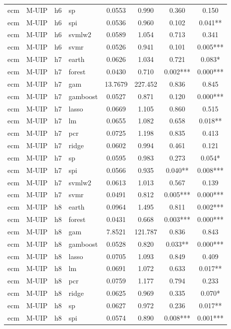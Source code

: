 \begin{ThreePartTable}
\begin{longtable}[t]{llclcccc}
ecm & M-UIP & h6 & sp & 0.0553 & 0.990 & 0.360 & 0.150\\
ecm & M-UIP & h6 & spi & 0.0536 & 0.960 & 0.102 & 0.041**\\
ecm & M-UIP & h6 & svmlw2 & 0.0589 & 1.054 & 0.713 & 0.341\\
ecm & M-UIP & h6 & svmr & 0.0526 & 0.941 & 0.101 & 0.005***\\
\addlinespace
ecm & M-UIP & h7 & earth & 0.0626 & 1.034 & 0.721 & 0.083*\\
ecm & M-UIP & h7 & forest & 0.0430 & 0.710 & 0.002*** & 0.000***\\
ecm & M-UIP & h7 & gam & 13.7679 & 227.452 & 0.836 & 0.845\\
ecm & M-UIP & h7 & gamboost & 0.0527 & 0.871 & 0.120 & 0.000***\\
ecm & M-UIP & h7 & lasso & 0.0669 & 1.105 & 0.860 & 0.515\\
ecm & M-UIP & h7 & lm & 0.0655 & 1.082 & 0.658 & 0.018**\\
ecm & M-UIP & h7 & pcr & 0.0725 & 1.198 & 0.835 & 0.413\\
ecm & M-UIP & h7 & ridge & 0.0602 & 0.994 & 0.461 & 0.121\\
ecm & M-UIP & h7 & sp & 0.0595 & 0.983 & 0.273 & 0.054*\\
ecm & M-UIP & h7 & spi & 0.0566 & 0.935 & 0.040** & 0.008***\\
ecm & M-UIP & h7 & svmlw2 & 0.0613 & 1.013 & 0.567 & 0.139\\
ecm & M-UIP & h7 & svmr & 0.0491 & 0.812 & 0.005*** & 0.000***\\
\addlinespace
ecm & M-UIP & h8 & earth & 0.0964 & 1.495 & 0.811 & 0.002***\\
ecm & M-UIP & h8 & forest & 0.0431 & 0.668 & 0.003*** & 0.000***\\
ecm & M-UIP & h8 & gam & 7.8521 & 121.787 & 0.836 & 0.843\\
ecm & M-UIP & h8 & gamboost & 0.0528 & 0.820 & 0.033** & 0.000***\\
ecm & M-UIP & h8 & lasso & 0.0705 & 1.093 & 0.849 & 0.409\\
ecm & M-UIP & h8 & lm & 0.0691 & 1.072 & 0.633 & 0.017**\\
ecm & M-UIP & h8 & pcr & 0.0759 & 1.177 & 0.794 & 0.233\\
ecm & M-UIP & h8 & ridge & 0.0625 & 0.969 & 0.335 & 0.070*\\
ecm & M-UIP & h8 & sp & 0.0627 & 0.972 & 0.236 & 0.017**\\
ecm & M-UIP & h8 & spi & 0.0574 & 0.890 & 0.008*** & 0.001***\\

\end{longtable}
\end{ThreePartTable}
